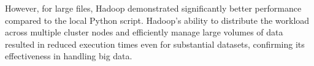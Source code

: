 \noindent However, for large files, Hadoop demonstrated significantly better performance compared to the local Python script. Hadoop's ability to distribute the workload across multiple cluster nodes and efficiently manage large volumes of data resulted in reduced execution times even for substantial datasets, confirming its effectiveness in handling big data.

